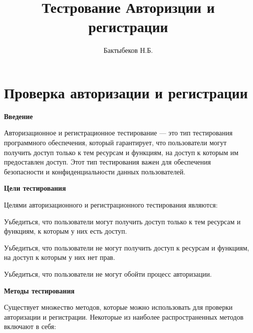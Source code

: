 

\title{Тестрование Авторизции и регистрации}
\author{Бактыбеков Н.Б.}





\newpage
\setcounter{page}{1}

{}


\section*{Проверка авторизации и регистрации}


\textbf{Введение}

Авторизационное и регистрационное тестирование — это тип тестирования программного обеспечения, который гарантирует, что пользователи могут получить доступ только к тем ресурсам и функциям, на доступ к которым им предоставлен доступ. Этот тип тестирования важен для обеспечения безопасности и конфиденциальности данных пользователей.

\textbf{Цели тестирования}

Целями авторизационного и регистрационного тестирования являются:

\begin{compactitem}
    \item    Уьбедиться, что пользователи могут получить доступ только к тем ресурсам и функциям, к которым у них есть доступ.
    \item    Уьбедиться, что пользователи не могут получить доступ к ресурсам и функциям, на доступ к которым у них нет прав.
    \item    Уьбедиться, что пользователи не могут обойти процесс авторизации.
\end{compactitem}

\textbf{Методы тестирования}


Существует множество методов, которые можно использовать для проверки авторизации и регистрации. Некоторые из наиболее распространенных методов включают в себя:

